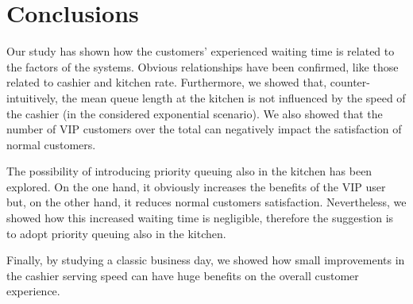 \section{Conclusions}
Our study has shown how the customers' experienced waiting time is related to the factors of the systems. Obvious relationships have been confirmed, like those related to cashier and kitchen rate. 
Furthermore, we showed that, counter-intuitively, the mean queue length at the kitchen is not influenced by the speed of the cashier (in the considered exponential scenario). 
We also showed that the number of VIP customers over the total can negatively impact the satisfaction of normal customers.

The possibility of introducing priority queuing also in the kitchen has been explored. On the one hand, it obviously increases the benefits of the VIP user but, on the other hand, it reduces normal customers satisfaction. Nevertheless, we showed how this increased waiting time is negligible, therefore the suggestion is to adopt priority queuing also in the kitchen.

Finally, by studying a classic business day, we showed how small improvements in the cashier serving speed can have huge benefits on the overall customer experience.
